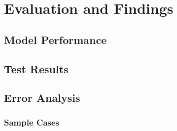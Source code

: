 \chapter{Evaluation and Findings}
\section{Model Performance}

\section{Test Results}

\section{Error Analysis}
    \subsection{Sample Cases}
